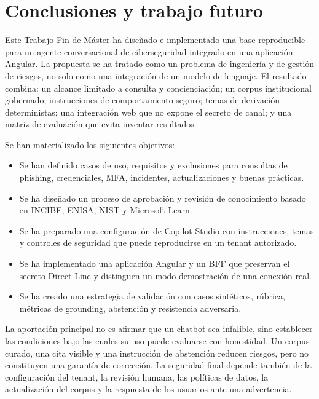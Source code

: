 \documentclass[12pt,twoside,titlepage]{book}
\begin{document}
\chapter{Conclusiones y trabajo futuro}
\label{chap:conclusiones}

Este Trabajo Fin de M\'aster ha dise\~nado e implementado una base reproducible para un agente conversacional de ciberseguridad integrado en una aplicaci\'on Angular. La propuesta se ha tratado como un problema de ingenier\'ia y de gesti\'on de riesgos, no solo como una integraci\'on de un modelo de lenguaje. El resultado combina: un alcance limitado a consulta y concienciaci\'on; un corpus institucional gobernado; instrucciones de comportamiento seguro; temas de derivaci\'on deterministas; una integraci\'on web que no expone el secreto de canal; y una matriz de evaluaci\'on que evita inventar resultados.

Se han materializado los siguientes objetivos:

\begin{itemize}
  \item Se han definido casos de uso, requisitos y exclusiones para consultas de phishing, credenciales, MFA, incidentes, actualizaciones y buenas pr\'acticas.
  \item Se ha dise\~nado un proceso de aprobaci\'on y revisi\'on de conocimiento basado en INCIBE, ENISA, NIST y Microsoft Learn.
  \item Se ha preparado una configuraci\'on de Copilot Studio con instrucciones, temas y controles de seguridad que puede reproducirse en un tenant autorizado.
  \item Se ha implementado una aplicaci\'on Angular y un BFF que preservan el secreto Direct Line y distinguen un modo demostraci\'on de una conexi\'on real.
  \item Se ha creado una estrategia de validaci\'on con casos sint\'eticos, r\'ubrica, m\'etricas de grounding, abstenci\'on y resistencia adversaria.
\end{itemize}

La aportaci\'on principal no es afirmar que un chatbot sea infalible, sino establecer las condiciones bajo las cuales su uso puede evaluarse con honestidad. Un corpus curado, una cita visible y una instrucci\'on de abstenci\'on reducen riesgos, pero no constituyen una garant\'ia de correcci\'on. La seguridad final depende tambi\'en de la configuraci\'on del tenant, la revisi\'on humana, las pol\'iticas de datos, la actualizaci\'on del corpus y la respuesta de los usuarios ante una advertencia.
\end{document}
